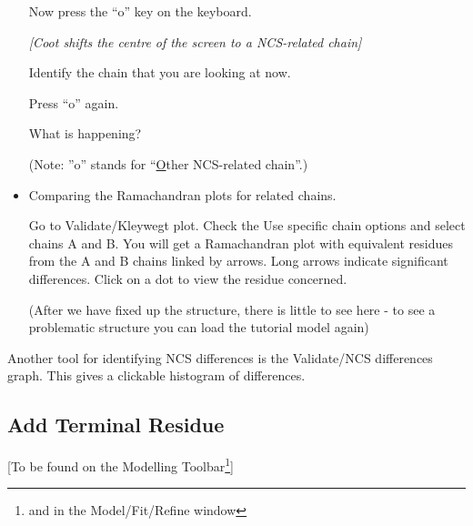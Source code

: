 \documentclass{article}
\begin{document}
\begin{itemize}
  Now press the ``o'' key on the keyboard.

  \textsl{ [\emph{Coot} shifts the centre of the screen to a NCS-related
    chain]}

  Identify the chain that you are looking at now.

  Press ``o'' again.

  What is happening?

  (Note: ''o'' stands for ``\underline{O}ther NCS-related chain''.)


\item Comparing the Ramachandran plots for related chains.

  Go to \textsf{Validate/Kleywegt plot}. Check the \textsf{Use
    specific chain} options and select chains A and B. You will get a
  Ramachandran plot with equivalent residues from the A and B chains
  linked by arrows. Long arrows indicate significant differences.
  Click on a dot to view the residue concerned.

  (After we have fixed up the structure, there is little to see here -
  to see a problematic structure you can load the tutorial model again)

\end{itemize}

Another tool for identifying NCS differences is the
\textsf{Validate/NCS differences} graph. This gives a clickable
histogram of differences.


\subsection{Add Terminal Residue}
[To be found on the Modelling Toolbar\footnote{and in the
  Model/Fit/Refine window}]
\end{document}
